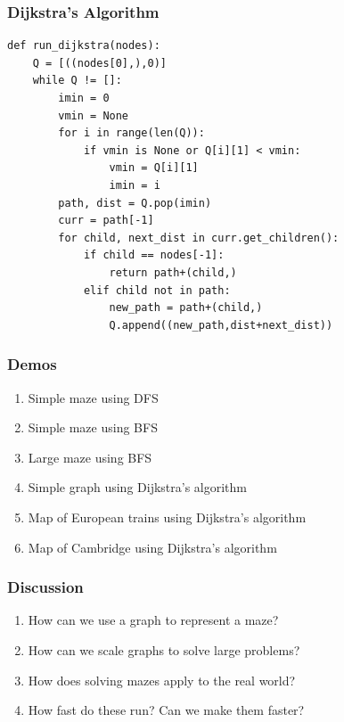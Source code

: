 \documentclass{beamer}
\begin{document}
\begin{frame}[fragile]
    \frametitle{Dijkstra's Algorithm}
\begin{lstlisting}
def run_dijkstra(nodes):
    Q = [((nodes[0],),0)]
    while Q != []:
        imin = 0
        vmin = None
        for i in range(len(Q)):
            if vmin is None or Q[i][1] < vmin:
                vmin = Q[i][1]
                imin = i
        path, dist = Q.pop(imin)
        curr = path[-1]
        for child, next_dist in curr.get_children():
            if child == nodes[-1]:
                return path+(child,)
            elif child not in path:
                new_path = path+(child,)
                Q.append((new_path,dist+next_dist))
\end{lstlisting}

\end{frame}


\begin{frame}
    \frametitle{Demos}

    \begin{enumerate}[(1)]
        \item Simple maze using DFS
        \item Simple maze using BFS
        \item Large maze using BFS
        \item Simple graph using Dijkstra's algorithm
        \item Map of European trains using Dijkstra's algorithm
        \item Map of Cambridge using Dijkstra's algorithm
    \end{enumerate}

\end{frame}

\begin{frame}
    \frametitle{Discussion}

    \begin{enumerate}[(1)]
        \item How can we use a graph to represent a maze?
        \item How can we scale graphs to solve large problems?
        \item How does solving mazes apply to the real world?
        \item How fast do these run? Can we make them faster?
    \end{enumerate}

\end{frame}
\end{document}
